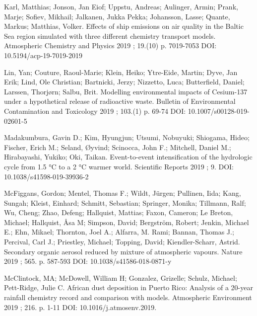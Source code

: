 \begin{list}{}{\setlength{\leftmargin}{15pt}\setlength{\itemindent}{-\leftmargin}}
\item[]
Karl, Matthias; Jonson, Jan Eiof; Uppstu, Andreas; Aulinger, Armin; Prank, Marje; Sofiev, Mikhail; Jalkanen, Jukka Pekka; Johansson, Lasse; Quante, Markus; Matthias, Volker.
Effects of ship emissions on air quality in the Baltic Sea region simulated with three different chemistry transport models.
Atmospheric Chemistry and Physics 2019 ; 19.(10) p. 7019-7053
DOI: 10.5194/acp-19-7019-2019

\item[]
Lin, Yan; Couture, Raoul-Marie; Klein, Heiko; Ytre-Eide, Martin; Dyve, Jan Erik; Lind, Ole Christian; Bartnicki, Jerzy; Nizzetto, Luca; Butterfield, Daniel; Larssen, Thorjørn; Salbu, Brit.
Modelling environmental impacts of Cesium-137 under a hypothetical release of radioactive waste.
Bulletin of Environmental Contamination and Toxicology 2019 ; 103.(1) p. 69-74
DOI: 10.1007/s00128-019-02601-5

\item[]
Madakumbura, Gavin D.; Kim, Hyungjun; Utsumi, Nobuyuki; Shiogama, Hideo; Fischer, Erich M.; Seland, Øyvind; Scinocca, John F.; Mitchell, Daniel M.; Hirabayashi, Yukiko; Oki, Taikan.
Event-to-event intensification of the hydrologic cycle from 1.5 °C to a 2 °C warmer world.
Scientific Reports 2019 ; 9.
DOI: 10.1038/s41598-019-39936-2

\item[]
McFiggans, Gordon; Mentel, Thomas F.; Wildt, Jürgen; Pullinen, Iida; Kang, Sungah; Kleist, Einhard; Schmitt, Sebastian; Springer, Monika; Tillmann, Ralf; Wu, Cheng; Zhao, Defeng; Hallquist, Mattias; Faxon, Cameron; Le Breton, Michael; Hallquist, Åsa M; Simpson, David; Bergström, Robert; Jenkin, Michael E.; Ehn, Mikael; Thornton, Joel A.; Alfarra, M. Rami; Bannan, Thomas J.; Percival, Carl J.; Priestley, Michael; Topping, David; Kiendler-Scharr, Astrid.
Secondary organic aerosol reduced by mixture of atmospheric vapours.
Nature 2019 ; 565. p. 587-593
DOI: 10.1038/s41586-018-0871-y

\item[]
McClintock, MA; McDowell, William H; Gonzalez, Grizelle; Schulz, Michael; Pett-Ridge, Julie C.
African dust deposition in Puerto Rico: Analysis of a 20-year rainfall chemistry record and comparison with models.
Atmospheric Environment 2019 ; 216. p. 1-11
DOI: 10.1016/j.atmosenv.2019.\hfill{}


\end{list}

